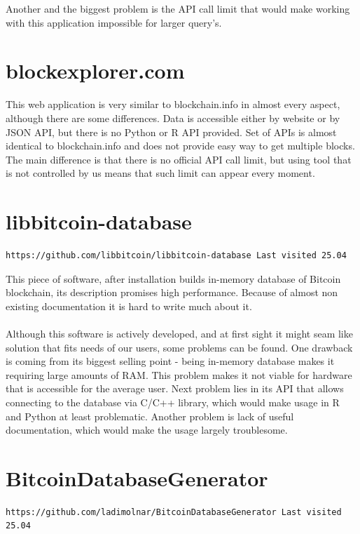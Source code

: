 \documentclass[12pt, en, eng, oneside]{mgr}
\begin{document}
Another and the biggest problem is the API call limit that would make working with this application impossible for larger query's.

\section{blockexplorer.com}

This web application is very similar to blockchain.info in almost every aspect, although there are some differences. Data is accessible either by website or by JSON API, but there is no Python or R API provided. Set of APIs is almost identical to blockchain.info and does not provide easy way to get multiple blocks. The main difference is that there is no official API call limit, but using tool that is not controlled by us means that such limit can appear every moment.

\section{libbitcoin-database}

\begin{verbatim}
https://github.com/libbitcoin/libbitcoin-database Last visited 25.04
\end{verbatim}

This piece of software, after installation builds in-memory database of Bitcoin blockchain, its description promises high performance. Because of almost non existing documentation it is hard to write much about it.
\\
\\
Although this software is actively developed, and at first sight it might seam like solution that fits needs of our users, some problems can be found. One drawback is coming from its biggest selling point - being in-memory database makes it requiring large amounts of RAM. This problem makes it not viable for hardware that is accessible for the average user. Next problem lies in its API that allows connecting to the database via C/C++ library, which would make usage in R and Python at least problematic. Another problem is lack of useful documentation, which would make the usage largely troublesome.

\section{BitcoinDatabaseGenerator}

\begin{verbatim}
https://github.com/ladimolnar/BitcoinDatabaseGenerator Last visited 25.04
\end{verbatim}
\end{document}
